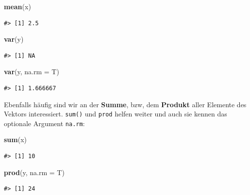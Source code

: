 \documentclass[]{book}
\newenvironment{Shaded}{\begin{snugshade}}{\end{snugshade}}
\newcommand{\KeywordTok}[1]{\textcolor[rgb]{0.13,0.29,0.53}{\textbf{#1}}}
\newcommand{\DataTypeTok}[1]{\textcolor[rgb]{0.13,0.29,0.53}{#1}}
\newcommand{\NormalTok}[1]{#1}
\begin{document}
\begin{Shaded}
\begin{Highlighting}[]
\KeywordTok{mean}\NormalTok{(x)}
\end{Highlighting}
\end{Shaded}

\begin{verbatim}
#> [1] 2.5
\end{verbatim}

\begin{Shaded}
\begin{Highlighting}[]
\KeywordTok{var}\NormalTok{(y)}
\end{Highlighting}
\end{Shaded}

\begin{verbatim}
#> [1] NA
\end{verbatim}

\begin{Shaded}
\begin{Highlighting}[]
\KeywordTok{var}\NormalTok{(y, }\DataTypeTok{na.rm =}\NormalTok{ T)}
\end{Highlighting}
\end{Shaded}

\begin{verbatim}
#> [1] 1.666667
\end{verbatim}

Ebenfalls häufig sind wir an der \textbf{Summe}, bzw, dem
\textbf{Produkt} aller Elemente des Vektors interessiert. \texttt{sum()}
und \texttt{prod} helfen weiter und auch sie kennen das optionale
Argument \texttt{na.rm}:

\begin{Shaded}
\begin{Highlighting}[]
\KeywordTok{sum}\NormalTok{(x)}
\end{Highlighting}
\end{Shaded}

\begin{verbatim}
#> [1] 10
\end{verbatim}

\begin{Shaded}
\begin{Highlighting}[]
\KeywordTok{prod}\NormalTok{(y, }\DataTypeTok{na.rm =}\NormalTok{ T)}
\end{Highlighting}
\end{Shaded}

\begin{verbatim}
#> [1] 24
\end{verbatim}
\end{document}
